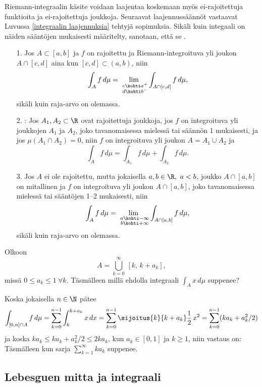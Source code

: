 Riemann-integraalin käsite voidaan laajentaa koskemaan myös ei-rajoitettuja funktioita ja 
ei-rajoitettuja joukkoja. Seuraavat laajennussäännöt vastaavat Luvussa 
\ref{integraalin laajennuksia} tehtyjä sopimuksia. Sikäli kuin integaali on näiden sääntöjen
mukaisesti määritelty, sanotaan, että se .
\begin{itemize}
\item[1.] Jos $A\subset[a,b]$ ja $f$ on rajoitettu ja Riemann-integroituva yli joukon 
          $A\cap[c,d]$ aina kun $[c,d]\subset(a,b)$, niin
          \[
          \int_A f\, d\mu
          =\lim_{\substack{\ c\kohti a^+ \\ d\kohti b^-}}\int_{A\cap [c,d]} f\,d\mu,
          \]
          sikäli kuin raja-arvo on olemassa.
\item[2.] : Jos $A_1,A_2\subset\R$ ovat rajoitettuja joukkoja, jos
          $f$ on integroituva yli joukkojen $A_1$ ja $A_2$, joko tavanomaisessa mielessä tai
          säännön 1 mukaisesti, ja jos $\mu(A_1 \cap A_2)=0$, niin $f$ on integroituva yli 
          joukon $A=A_1 \cup A_2$ ja
          \[
          \int_A f\,d\mu = \int_{A_1} f\,d\mu + \int_{A_2} f\,d\mu.
          \]
\item[3.] Jos $A$ ei ole rajoitettu, mutta jokaisella $a,b \in \R,\ a<b$, joukko $A\cap [a,b]$ 
          on mitallinen ja $f$ on integroituva yli joukon $A\cap [a,b]$, joko tavanomaisessa
          mielessä tai sääntöjen 1--2 mukaisesti, niin
          \[
          \int_A f\, d\mu
          =\lim_{\substack{\ a\kohti -\infty \\ b\kohti +\infty}}\int_{A\cap [a,b]} f\,d\mu,
          \]
          sikäli kuin raja-arvo on olemassa.
\end{itemize}
\begin{Exa} Olkoon
\[
A=\bigcup_{k=0}^\infty\,[k,\,k+a_k],
\]
missä $0 \le a_k \le 1\ \forall k$. Täsmälleen millä ehdolla integraali $\int_A x\,d\mu$
suppenee?
\end{Exa}
\ratk Koska jokaisella $n\in\N$ pätee
\[
\int_{[0,n] \cap A} f\,d\mu = \sum_{k=0}^{n-1} \int_k^{k+a_k} x\,dx
                            = \sum_{k=0}^{n-1}\sijoitus{k}{k+a_k} \frac{1}{2}\,x^2
                            = \sum_{k=0}^{n-1}(ka_k+a_k^2/2)
\]
ja koska $ka_k \le ka_k+a_k^2/2 \le 2ka_k$, kun $a_k\in[0,1]$ ja $k \ge 1$, niin vastaus on:
Täsmälleen kun sarja $\sum_{k=1}^\infty ka_k$ suppenee. \loppu 

\subsection*{Lebesguen mitta ja integraali}

